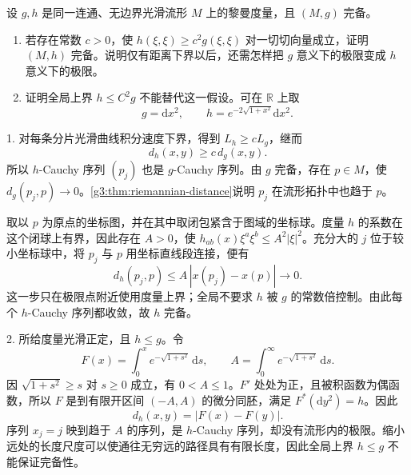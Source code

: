 \begin{exercise}\label{g3:ex:complete-metric-lower-bound}
	设 \(g,h\) 是同一连通、无边界光滑流形 \(M\) 上的黎曼度量，且 \((M,g)\) 完备。
	\begin{enumerate}
		\item 若存在常数 \(c>0\)，使 \(h(\xi,\xi)\ge c^2g(\xi,\xi)\) 对一切切向量成立，证明 \((M,h)\) 完备。说明仅有距离下界以后，还需怎样把 \(g\) 意义下的极限变成 \(h\) 意义下的极限。
		\item 证明全局上界 \(h\le C^2g\) 不能替代这一假设。可在 \(\mathbb R\) 上取
		\[
			g=\mathrm{d}x^2,\qquad
			h=e^{-2\sqrt{1+x^2}}\mathrm{d}x^2.
		\]
	\end{enumerate}
\end{exercise}
\begin{solution}
	1. 对每条分片光滑曲线积分速度下界，得到 \(L_h\ge cL_g\)，继而
	\[
		d_h(x,y)\ge c\,d_g(x,y).
	\]
	所以 \(h\)-Cauchy 序列 \((p_j)\) 也是 \(g\)-Cauchy 序列。由 \(g\) 完备，存在 \(p\in M\)，使 \(d_g(p_j,p)\to0\)。\cref{g3:thm:riemannian-distance}说明 \(p_j\) 在流形拓扑中也趋于 \(p\)。

	取以 \(p\) 为原点的坐标图，并在其中取闭包紧含于图域的坐标球。度量 \(h\) 的系数在这个闭球上有界，因此存在 \(A>0\)，使 \(h_{ab}(x)\xi^a\xi^b\le A^2|\xi|^2\)。充分大的 \(j\) 位于较小坐标球中，将 \(p_j\) 与 \(p\) 用坐标直线段连接，便有
	\[
		d_h(p_j,p)\le A\,|x(p_j)-x(p)|\longrightarrow0.
	\]
	这一步只在极限点附近使用度量上界；全局不要求 \(h\) 被 \(g\) 的常数倍控制。由此每个 \(h\)-Cauchy 序列都收敛，故 \(h\) 完备。

	2. 所给度量光滑正定，且 \(h\le g\)。令
	\[
		F(x)=\int_0^x e^{-\sqrt{1+s^2}}\,\mathrm{d}s,\qquad
		A=\int_0^\infty e^{-\sqrt{1+s^2}}\,\mathrm{d}s.
	\]
	因 \(\sqrt{1+s^2}\ge s\) 对 \(s\ge0\) 成立，有 \(0<A\le1\)。\(F'\) 处处为正，且被积函数为偶函数，所以 \(F\) 是到有限开区间 \((-A,A)\) 的微分同胚，满足 \(F^*(\mathrm{d}y^2)=h\)。因此
	\[
		d_h(x,y)=|F(x)-F(y)|.
	\]
	序列 \(x_j=j\) 映到趋于 \(A\) 的序列，是 \(h\)-Cauchy 序列，却没有流形内的极限。缩小远处的长度尺度可以使通往无穷远的路径具有有限长度，因此全局上界 \(h\le g\) 不能保证完备性。
\end{solution}

